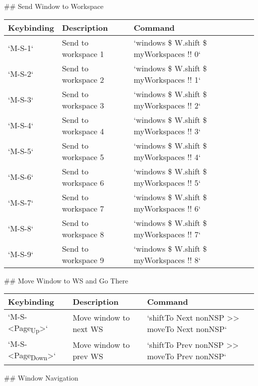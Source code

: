 \documentclass[11pt]{article}
\begin{document}
\#\# Send Window to Workspace

\begin{center}
\begin{tabular}{lll}
Keybinding & Description & Command\\
\hline
`M-S-1` & Send to workspace 1 & `windows \$ W.shift \$ myWorkspaces !! 0`\\
`M-S-2` & Send to workspace 2 & `windows \$ W.shift \$ myWorkspaces !! 1`\\
`M-S-3` & Send to workspace 3 & `windows \$ W.shift \$ myWorkspaces !! 2`\\
`M-S-4` & Send to workspace 4 & `windows \$ W.shift \$ myWorkspaces !! 3`\\
`M-S-5` & Send to workspace 5 & `windows \$ W.shift \$ myWorkspaces !! 4`\\
`M-S-6` & Send to workspace 6 & `windows \$ W.shift \$ myWorkspaces !! 5`\\
`M-S-7` & Send to workspace 7 & `windows \$ W.shift \$ myWorkspaces !! 6`\\
`M-S-8` & Send to workspace 8 & `windows \$ W.shift \$ myWorkspaces !! 7`\\
`M-S-9` & Send to workspace 9 & `windows \$ W.shift \$ myWorkspaces !! 8`\\
\end{tabular}
\end{center}

\#\# Move Window to WS and Go There

\begin{center}
\begin{tabular}{lll}
Keybinding & Description & Command\\
\hline
`M-S-<Page\textsubscript{Up}>` & Move window to next WS & `shiftTo Next nonNSP >> moveTo Next nonNSP`\\
`M-S-<Page\textsubscript{Down}>` & Move window to prev WS & `shiftTo Prev nonNSP >> moveTo Prev nonNSP`\\
\end{tabular}
\end{center}

\#\# Window Navigation
\end{document}
